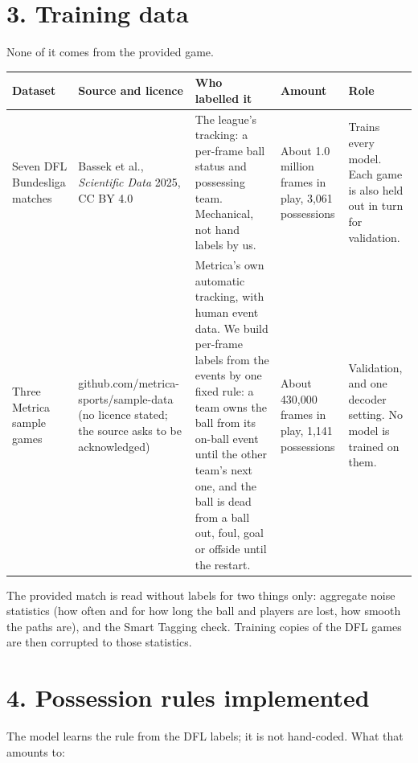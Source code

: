 \documentclass[10pt,a4paper]{article}
\begin{document}
\section*{3. Training data}


None of it comes from the provided game.


{\footnotesize
\begin{longtable}{>{\raggedright\arraybackslash}p{}>{\raggedright\arraybackslash}p{}>{\raggedright\arraybackslash}p{}>{\raggedright\arraybackslash}p{}>{\raggedright\arraybackslash}p{}}
\toprule
{}\textbf{Dataset} & {}\textbf{Source and licence} & {}\textbf{Who labelled it} & {}\textbf{Amount} & {}\textbf{Role} \\
\midrule
\endhead
{}Seven DFL Bundesliga matches & {}Bassek et al., \emph{Scientific Data} 2025, CC BY 4.0 & {}The league's tracking: a per-frame ball status and possessing team. Mechanical, not hand labels by us. & {}About 1.0 million frames in play, 3,061 possessions & {}Trains every model. Each game is also held out in turn for validation. \\
\addlinespace[3pt]
{}Three Metrica sample games & {}github.com/metrica-sports/sample-data (no licence stated; the source asks to be acknowledged) & {}Metrica's own automatic tracking, with human event data. We build per-frame labels from the events by one fixed rule: a team owns the ball from its on-ball event until the other team's next one, and the ball is dead from a ball out, foul, goal or offside until the restart. & {}About 430,000 frames in play, 1,141 possessions & {}Validation, and one decoder setting. No model is trained on them. \\
\bottomrule
\end{longtable}
}


The provided match is read without labels for two things only: aggregate noise statistics
(how often and for how long the ball and players are lost, how smooth the paths are), and the
Smart Tagging check. Training copies of the DFL games are then corrupted to those statistics.


\section*{4. Possession rules implemented}


The model learns the rule from the DFL labels; it is not hand-coded. What that amounts to:
\end{document}
